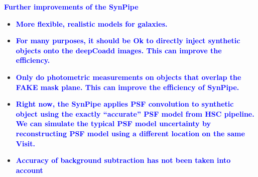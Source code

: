 \documentclass{pasj01}
\newcommand{\plan}[1]{\textcolor{blue} {\textbf{#1}}}
\begin{document}
    \plan{Further improvements of the SynPipe}
    \begin{itemize}
        \item \plan{More flexible, realistic models for galaxies.}
        \item \plan{For many purposes, it should be Ok to directly inject synthetic 
                    objects onto the deepCoadd images. 
                    This can improve the efficiency.}
        \item \plan{Only do photometric measurements on objects that overlap the FAKE
                    mask plane.  This can improve the efficiency of SynPipe.}
        \item \plan{Right now, the SynPipe applies PSF convolution to synthetic object 
                    using the exactly ``accurate'' PSF model from HSC pipeline. 
                    We can simulate the typical PSF model uncertainty by reconstructing 
                    PSF model using a different location on the same Visit.}
        \item \plan{Accuracy of background subtraction has not been taken into account}
    \end{itemize}

  
\end{document}
